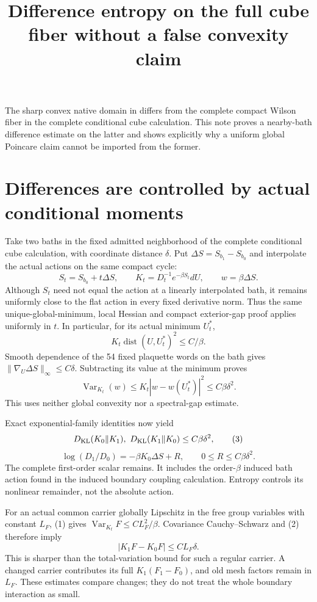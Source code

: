 \documentclass{article}
\title{Difference entropy on the full cube fiber without a false convexity claim}\author{}\date{}
\begin{document}
\maketitle
The sharp convex native domain in \cite[Section 3]{ND} differs from the complete compact Wilson fiber in the complete conditional cube calculation. This note proves a nearby-bath difference estimate on the latter and shows explicitly why a uniform global Poincare claim cannot be imported from the former.

\section{Differences are controlled by actual conditional moments}
Take two baths in the fixed admitted neighborhood of the complete conditional cube calculation, with coordinate distance $\delta$. Put $\Delta S=S_{b_1}-S_{b_0}$ and interpolate the actual actions on the same compact cycle:
\[
 S_t=S_{b_0}+t\Delta S,\qquad
 K_t=D_t^{-1}e^{-\beta S_t}dU,\qquad w=\beta\Delta S.
\]
Although $S_t$ need not equal the action at a linearly interpolated bath, it remains uniformly close to the flat action in every fixed derivative norm. Thus the same unique-global-minimum, local Hessian and compact exterior-gap proof applies uniformly in $t$. In particular, for its actual minimum $U_t^*$,
\[
 K_t\operatorname{dist}(U,U_t^*)^2\leq C/\beta.
 \tag{1}
\]
Smooth dependence of the 54 fixed plaquette words on the bath gives
$\|\nabla_U\Delta S\|_\infty\leq C\delta$. Subtracting its value at the minimum proves
\[
 \operatorname{Var}_{K_t}(w)
 \leq K_t|w-w(U_t^*)|^2
 \leq C\beta\delta^2.
 \tag{2}
\]
This uses neither global convexity nor a spectral-gap estimate.

Exact exponential-family identities now yield
\[
 D_{\rm KL}(K_0\Vert K_1),\ D_{\rm KL}(K_1\Vert K_0)
 \leq C\beta\delta^2,
 \tag{3}
\]
\[
 \log(D_1/D_0)=-\beta K_0\Delta S+R,
 \qquad0\leq R\leq C\beta\delta^2.
 \tag{4}
\]
The complete first-order scalar remains. It includes the order-$\beta$ induced bath action found in the induced boundary coupling calculation. Entropy controls its nonlinear remainder, not the absolute action.

For an actual common carrier globally Lipschitz in the free group variables with constant $L_F$, (1) gives $\operatorname{Var}_{K_t}F\leq CL_F^2/\beta$. Covariance Cauchy--Schwarz and (2) therefore imply
\[
 |K_1F-K_0F|\leq CL_F\delta.
 \tag{5}
\]
This is sharper than the total-variation bound for such a regular carrier. A changed carrier contributes its full $K_1(F_1-F_0)$, and old mesh factors remain in $L_F$. These estimates compare changes; they do not treat the whole boundary interaction as small.
\end{document}
